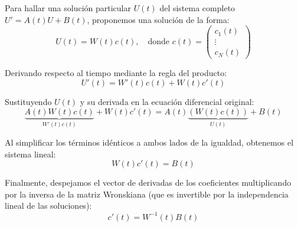 Para hallar una solución particular $U(t)$ del sistema completo $U' = A(t)U + B(t)$, proponemos una solución de la forma:
\[ 
U(t) = W(t) c(t), \quad \text{donde } c(t) = \begin{pmatrix} c_1(t) \\ \vdots \\ c_N(t) \end{pmatrix} 
\]

Derivando respecto al tiempo mediante la regla del producto:
\[ 
U'(t) = W'(t)c(t) + W(t)c'(t) 
\]

Sustituyendo $U(t)$ y su derivada en la ecuación diferencial original:
\[ 
\underbrace{A(t)W(t)c(t)}_{W'(t)c(t)} + W(t)c'(t) = A(t)\underbrace{\left(W(t)c(t)\right)}_{U(t)} + B(t) 
\]

Al simplificar los términos idénticos a ambos lados de la igualdad, obtenemos el sistema lineal:
\[ 
W(t)c'(t) = B(t) 
\]

Finalmente, despejamos el vector de derivadas de los coeficientes multiplicando por la inversa de la matriz Wronskiana (que es invertible por la independencia lineal de las soluciones):
\[ 
c'(t) = W^{-1}(t)B(t) 
\]

